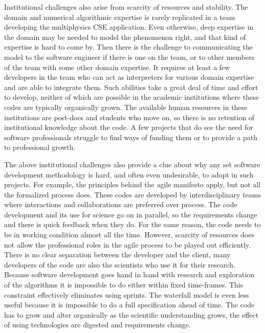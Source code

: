
Institutional challenges also arise from scarcity of
resources and stability. The domain and numerical algorithmic
expertise is rarely replicated in a team developing the multiphysics
CSE application. Even otherwise, deep expertise in the domain may be
needed to model the phenomenon right, and that kind of expertise is
hard to come by. Then there is the challenge to communicating the
model to the software engineer if there is one on the team, or to
other members of the team with some other domain expertise. It requires at least a
few developers in the team who can act as interpreters for various
domain expertise and are able to integrate them. Such abilities take a
great deal of time and effort to develop, neither of which are
possible in the academic institutions where these codes are typically
organically grown. The available human resources in these institutions
are post-docs and students who move on, so there is no retention of
institutional knowledge about the code.  A few projects that do see
the need for software professionals struggle to find ways of funding
them or to provide a path to professional growth. 

The above institutional challenges also provide a clue about why any
set software development methodology is hard, and often even
undesirable, to adopt in such projects. For example, the principles
behind the agile manifesto apply, but not all the formalized process
does. These codes are developed by interdisciplinary teams where
interactions and collaborations are preferred over process. The code
development and its use for science go on in parallel, so the
requirements change and there is quick feedback when they do. For the
same reason, the code needs to be in working condition almost all the
time. However, scarcity of resources does not allow the professional roles in
the agile process to be played out efficiently.  There is no clear
separation between the developer and the client, many developers of
the code are also the scientists who use it for their research. 
Because software development goes hand in hand with research and
exploration of the algorithms it is impossible to do either within
fixed time-frames. This constraint effectively eliminates using
sprints.  The waterfall model is even less useful because it is
impossible to do a full specification ahead of time. The code has to
grow and alter organically as the scientific understanding grows, the
effect of using technologies are digested and requirements change.

